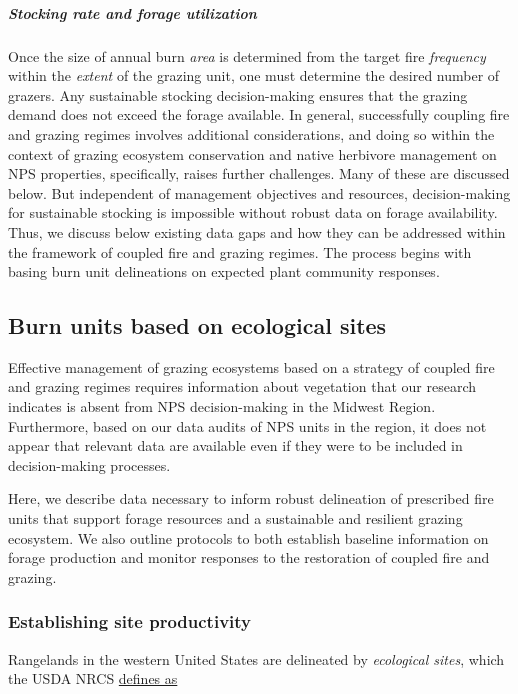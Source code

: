 \subparagraph{Stocking rate and forage utilization} Once the size of annual burn \emph{area} is determined from the target fire \emph{frequency} within the \emph{extent} of the grazing unit, one must determine the desired number of grazers. 
Any sustainable stocking decision-making ensures that the grazing demand does not exceed the forage available. 
In general, successfully coupling fire and grazing regimes involves additional considerations, and doing so within the context of grazing ecosystem conservation and native herbivore management on NPS properties, specifically, raises further challenges. 
Many of these are discussed below. 
But independent of management objectives and resources, decision-making for sustainable stocking is impossible without robust data on forage availability. 
Thus, we discuss below existing data gaps and how they can be addressed within the framework of coupled fire and grazing regimes. 
The process begins with basing burn unit delineations on expected plant community responses. 

\subsection{Burn units based on ecological sites}

Effective management of grazing ecosystems based on a strategy of coupled fire and grazing regimes requires information about vegetation that our research indicates is absent from NPS decision-making in the Midwest Region. 
Furthermore, based on our data audits of NPS units in the region, it does not appear that relevant data are available even if they were to be included in decision-making processes. 

Here, we describe data necessary to inform robust delineation of prescribed fire units that support forage resources and a sustainable and resilient grazing ecosystem. 
We also outline protocols to both establish baseline information on forage production and monitor responses to the restoration of coupled fire and grazing. 

\subsubsection{Establishing site productivity}

Rangelands in the western United States are delineated by \emph{ecological sites}, which the USDA NRCS   \href{https://www.nrcs.usda.gov/wps/portal/nrcs/detail/national/landuse/rangepasture/?cid=stelprdb1068392}{defines as}

